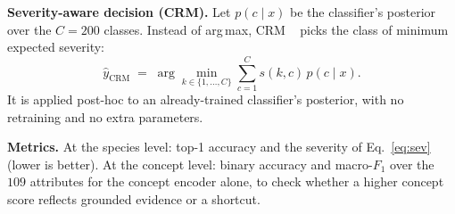 \textbf{Severity-aware decision (CRM).} Let $p(c\mid x)$ be the classifier's
posterior over the $C{=}200$ classes. Instead of arg\,max, CRM
~\cite{karthik2021nocost} picks the class of minimum expected severity:
\begin{equation}
  \hat{y}_{\mathrm{CRM}}
  \;=\; \arg\min_{k\in\{1,\dots,C\}} \sum_{c=1}^{C} s(k,c)\,p(c\mid x).
  \label{eq:crm}
\end{equation}
It is applied post-hoc to an already-trained classifier's posterior, with no
retraining and no extra parameters.

\textbf{Metrics.} At the species level: top-1 accuracy and the severity of
Eq.~\eqref{eq:sev} (lower is better). At the concept level: binary accuracy
and macro-$F_1$ over the $109$ attributes for the concept encoder alone, to
check whether a higher concept score reflects grounded evidence or a
shortcut.
